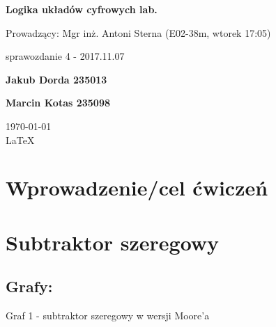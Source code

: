 \documentclass[12pt,a4paper]{article}
\begin{document}
	
	\begin{titlepage}
		
		\centering
		{\huge\bfseries Logika układów cyfrowych lab.\par}
		
		\vspace{0.5cm}
		Prowadzący: Mgr inż. Antoni Sterna (E02-38m, wtorek 17:05) \\
	
		\vspace{1.1cm}
		{\Large sprawozdanie 4 - 2017.11.07\par}
		\vfill
		
		{\large\bfseries Jakub Dorda 235013\par}
		{\large\bfseries Marcin Kotas 235098\par}
		
		\vspace{1cm}
		\today \\ \LaTeX
		
		\restoregeometry
	\end{titlepage}


	\section{Wprowadzenie/cel ćwiczeń}
		
	\section{Subtraktor szeregowy}
	
		\subsection{Grafy:}
	
			\begin{center}
				Graf 1 - subtraktor szeregowy w wersji Moore'a
			\end{center}
			
\end{document}
